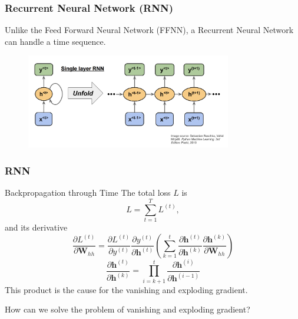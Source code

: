 \documentclass{beamer}
\begin{document}
\begin{frame}[t]
	\frametitle{Recurrent Neural Network (RNN)}
	Unlike the Feed Forward Neural Network (FFNN), a Recurrent Neural Network can handle a time sequence. \\
	\begin{figure}[ht]
		\centering
		\includegraphics[width=0.8\textwidth]{images/RNN-pic.png}
	\end{figure}
\end{frame}

\begin{frame}[t]
	\frametitle{RNN}
	\begin{block}{Backpropagation through Time}
	The total loss $ L $ is
	\[L = \sum_{t=1}^T L^{(t)},\]
	and its derivative
	\[ \frac{\partial L^{(t)}}{\partial \boldsymbol{W}_{hh}} = \frac{\partial L^{(t)}}{\partial y^{(t)}}  \frac{\partial y^{(t)}}{\partial \boldsymbol{h}^{(t)}} 
	\left( \sum_{k=1}^{t} \frac{\partial \boldsymbol{h}^{(t)}}{\partial \boldsymbol{h}^{(k)}} \frac{\partial \boldsymbol{h}^{(k)}}{\partial \boldsymbol{W}_{hh}}  \right)   \] 
	\[ \frac{\partial \boldsymbol{h}^{(t)}}{\partial \boldsymbol{h}^{(k)}} = \prod_{i=k+1}^{t} \frac{\partial \boldsymbol{h}^{(i)}}{\partial \boldsymbol{h}^{(i-1)}}  \] 
	This product is the cause for the vanishing and exploding gradient.
	\end{block}
	How can we solve the problem of vanishing and exploding gradient? 
\end{frame}
\end{document}
